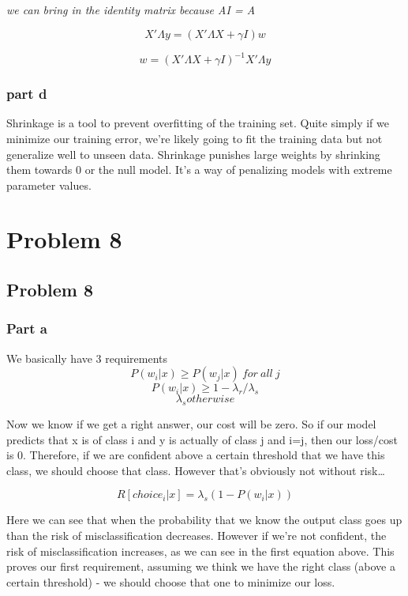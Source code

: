 \documentclass[11pt]{article}
\begin{document}
\emph{we can bring in the identity matrix because AI = A}

$$X' \Lambda y = (X' \Lambda X + \gamma I )w$$

$$w = (X' \Lambda X + \gamma I)^{-1} X' \Lambda y$$

\subsubsection{part d}
\label{sec-7-1-4}
Shrinkage is a tool to prevent overfitting of the training set. Quite simply if we minimize our training error, we're likely going to fit the training data but not generalize well to unseen data. Shrinkage punishes large weights by shrinking them towards 0 or the null model. It's a way of penalizing models with extreme parameter values.
\newpage

\section{Problem 8}
\label{sec-8}

\subsection{Problem 8}
\label{sec-8-1}
\subsubsection{Part a}
\label{sec-8-1-1}
We basically have 3 requirements
$$ P(w_i | x) \geq P(w_j | x)\ for\ all\ j $$
$$ P(w_i | x) \geq 1 - \lambda_r / \lambda_s $$
$$ \lambda_s  otherwise $$

Now we know if we get a right answer, our cost will be zero. So if our model predicts that x is of class i and y is actually of class j and i=j, then our loss/cost is 0. Therefore, if we are confident above a certain threshold that we have this class, we should choose that class. However that's obviously not without risk\ldots{}

$$ R[choice_i | x] =  \lambda_s (1-P(w_i |x)) $$

Here we can see that when the probability that we know the output class goes up than the risk of misclassification decreases. However if we're not confident, the risk of misclassification increases, as we can see in the first equation above. This proves our first requirement, assuming we think we have the right class (above a certain threshold) - we should choose that one to minimize our loss.
\end{document}
